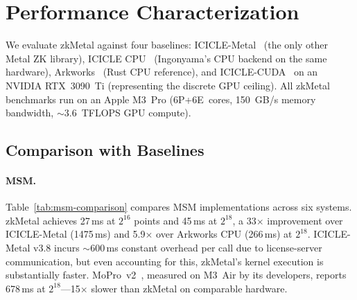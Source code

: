
\section{Performance Characterization}
\label{sec:perf}

We evaluate zkMetal against four baselines: ICICLE-Metal~\cite{icicle} (the only other Metal ZK library), ICICLE CPU~\cite{icicle} (Ingonyama's CPU backend on the same hardware), Arkworks~\cite{arkworks} (Rust CPU reference), and ICICLE-CUDA~\cite{icicle} on an NVIDIA RTX~3090~Ti (representing the discrete GPU ceiling).
All zkMetal benchmarks run on an Apple M3~Pro (6P+6E~cores, 150~GB/s memory bandwidth, $\sim$3.6~TFLOPS GPU compute).

\subsection{Comparison with Baselines}
\label{sec:baselines}

\paragraph{MSM.}
Table~\ref{tab:msm-comparison} compares MSM implementations across six systems.
zkMetal achieves 27\,ms at $2^{16}$ points and 45\,ms at $2^{18}$, a 33$\times$ improvement over ICICLE-Metal (1475\,ms) and 5.9$\times$ over Arkworks CPU (266\,ms) at $2^{18}$.
ICICLE-Metal v3.8 incurs $\sim$600\,ms constant overhead per call due to license-server communication, but even accounting for this, zkMetal's kernel execution is substantially faster.
MoPro~v2~\cite{mopro}, measured on M3~Air by its developers, reports 678\,ms at $2^{18}$---15$\times$ slower than zkMetal on comparable hardware.

